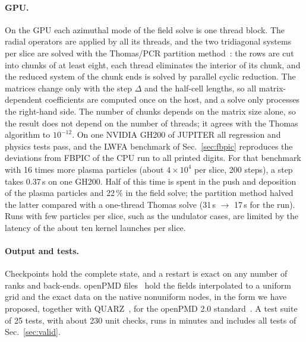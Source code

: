 \documentclass[preprint,12pt]{elsarticle}
\begin{document}
\paragraph*{GPU.} On the GPU each azimuthal mode of the field solve is one thread block. The radial operators are applied by all its threads, and the two tridiagonal systems per slice are solved with the Thomas/PCR partition method~\cite{Laszlo2016}: the rows are cut into chunks of at least eight, each thread eliminates the interior of its chunk, and the reduced system of the chunk ends is solved by parallel cyclic reduction. The matrices change only with the step $\Delta$ and the half-cell lengths, so all matrix-dependent coefficients are computed once on the host, and a solve only processes the right-hand side. The number of chunks depends on the matrix size alone, so the result does not depend on the number of threads; it agrees with the Thomas algorithm to $10^{-12}$. On one NVIDIA GH200 of JUPITER all regression and physics tests pass, and the LWFA benchmark of Sec.~\ref{sec:fbpic} reproduces the deviations from FBPIC of the CPU run to all printed digits. For that benchmark with 16 times more plasma particles (about $4\times10^4$ per slice, 200 steps), a step takes 0.37\,s on one GH200. Half of this time is spent in the push and deposition of the plasma particles and 22\,\% in the field solve; the partition method halved the latter compared with a one-thread Thomas solve (31\,s $\to$ 17\,s for the run). Runs with few particles per slice, such as the undulator cases, are limited by the latency of the about ten kernel launches per slice.

\paragraph*{Output and tests.} Checkpoints hold the complete state, and a restart is exact on any number of ranks and back-ends. openPMD files~\cite{openPMD} hold the fields interpolated to a uniform grid and the exact data on the native nonuniform nodes, in the form we have proposed, together with QUARZ~\cite{QUARZ}, for the openPMD 2.0 standard~\cite{openPMDPR}. A test suite of 25 tests, with about 230 unit checks, runs in minutes and includes all tests of Sec.~\ref{sec:valid}.
\end{document}
